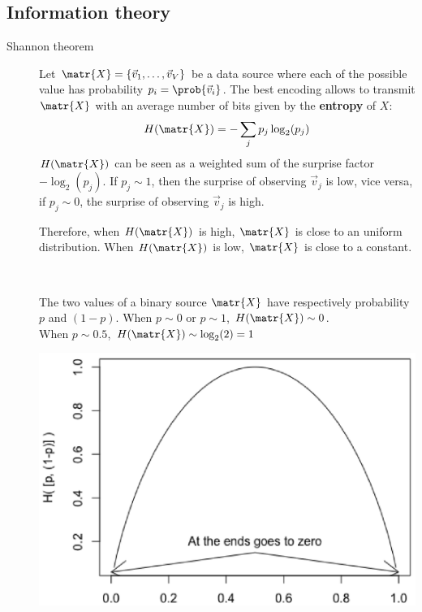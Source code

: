 \subsection{Information theory} \label{sec:information_theory}

\begin{description}
    \item[Shannon theorem] 
        Let $\matr{X} = \{ \vec{v}_1, \dots, \vec{v}_V \}$ be a data source where 
        each of the possible value has probability $p_i = \prob{\vec{v}_i}$.
        The best encoding allows to transmit $\matr{X}$ with 
        an average number of bits given by the \textbf{entropy} of $X$: 
        \[ H(\matr{X}) = - \sum_j p_j \log_2(p_j) \]
        $H(\matr{X})$ can be seen as a weighted sum of the surprise factor $-\log_2(p_j)$.
        If $p_j \sim 1$, then the surprise of observing $\vec{v}_j$ is low, vice versa,
        if $p_j \sim 0$, the surprise of observing $\vec{v}_j$ is high.
        
        Therefore, when $H(\matr{X})$ is high, $\matr{X}$ is close to an uniform distribution.
        When $H(\matr{X})$ is low, $\matr{X}$ is close to a constant.

        \begin{example} \phantom{}\\
            \begin{minipage}{.50\linewidth}
                The two values of a binary source $\matr{X}$ have respectively probability $p$ and $(1-p)$.
                When $p \sim 0$ or $p \sim 1$, $H(\matr{X}) \sim 0$.\\
                When $p \sim 0.5$, $H(\matr{X}) \sim \log_2(2)=1$
            \end{minipage}
            \begin{minipage}{.45\linewidth}
                \centering
                \includegraphics[width=\linewidth]{img/binary_entropy.png}
            \end{minipage}
        \end{example}


\end{description}
